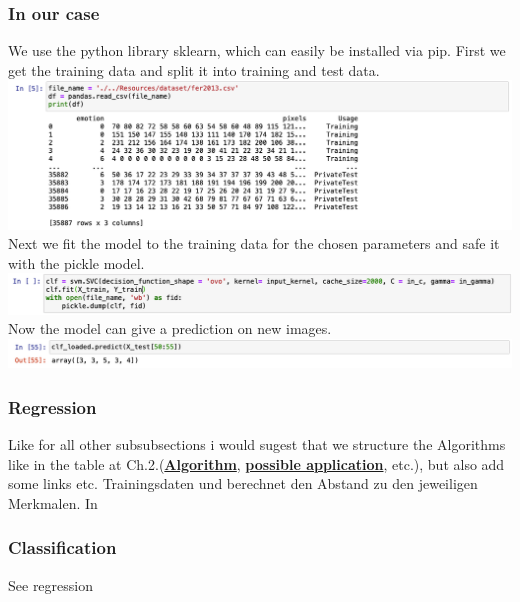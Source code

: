 \subsubsection{In our case}
We use the python library sklearn, which can easily be installed via pip.
First we get the training data and split it into training and test data.\\
\includegraphics[scale=0.4]{Images/trainingdata.png} \\
Next we fit the model to the training data for the chosen parameters and safe it with the pickle model. \\
\includegraphics[scale=0.4]{Images/trainmodel.png} \\
Now the model can give a prediction on new images. \\
\includegraphics[scale=0.4]{Images/svm_prediction.png}




\subsubsection{Regression}
Like for all other subsubsections i would sugest that we structure the Algorithms like in the table at Ch.2.(\textbf{\underline{Algorithm}}, \textbf{\underline{possible application}}, etc.), but also add some links etc. Trainingsdaten und berechnet den Abstand zu den jeweiligen Merkmalen. In 
 

\subsubsection{Classification}
See regression


